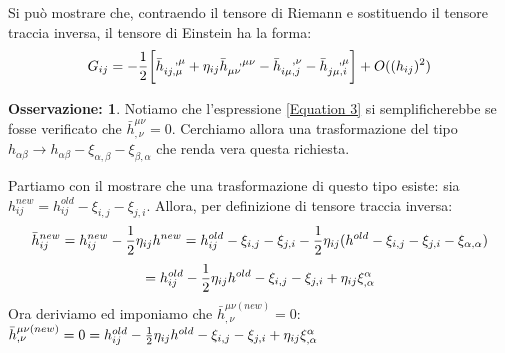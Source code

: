 \documentclass[]{report}
\theoremstyle{definition}
\theoremstyle{Theorem}
\theoremstyle{definition}
\theoremstyle{definition}
\theoremstyle{definition}
\newtheorem{Obs}[Def]{Osservazione:}
\begin{document}
Si può mostrare che, contraendo il tensore di Riemann e sostituendo il tensore traccia inversa, il tensore di Einstein ha la forma:
\begin{equation}
	\label{Equation 3}
	G_{ij}=-{1\over 2}\bigg[\bar{h}_{ij,\mu}^{\hspace{8pt},\mu}+\eta_{ij}\bar{h}_{\mu\nu}^{\hspace{8pt},\mu\nu}-\bar{h}_{i\mu,j}^{\hspace{8pt},\nu}-\bar{h}_{j\mu,i}^{\hspace{8pt},\mu}\bigg]+O((h_{ij})^2)
\end{equation}

\begin{Obs}
	Notiamo che l'espressione \ref{Equation 3} si semplificherebbe se fosse verificato che $\bar{h}^{\mu\nu}_{,\nu}=0$. Cerchiamo allora una trasformazione del tipo $h_{\alpha\beta}\rightarrow h_{\alpha\beta}-\xi_{\alpha,\beta}-\xi_{\beta,\alpha}$ che renda vera questa richiesta.		
\end{Obs}
Partiamo con il mostrare che una trasformazione di questo tipo esiste: sia $h_{ij}^{new}=h_{ij}^{old}-\xi_{i,j}-\xi_{j,i}$. Allora, per definizione di tensore traccia inversa:
$$\bar{h}_{ij}^{new}=h_{ij}^{new}-{1\over 2}\eta_{ij}h^{new}=h_{ij}^{old}-\xi_{i,j}-\xi_{j,i}-{1\over 2}\eta_{ij}(h^{old}-\xi_{i,j}-\xi_{j,i}-\xi_{\alpha,\alpha})$$
$$=h_{ij}^{old}-{1\over 2}\eta_{ij}h^{old}-\xi_{i,j}-\xi_{j,i}+\eta_{ij}\xi_{,\alpha}^\alpha$$
Ora deriviamo ed imponiamo che $\bar{h}^{\mu\nu(new)}_{,\nu}=0$:
$\bar{h}^{\mu\nu(new)}_{,\nu}=0=h_{ij}^{old}-{1\over 2}\eta_{ij}h^{old}-\xi_{i,j}-\xi_{j,i}+\eta_{ij}\xi_{,\alpha}^\alpha$
\end{document}
